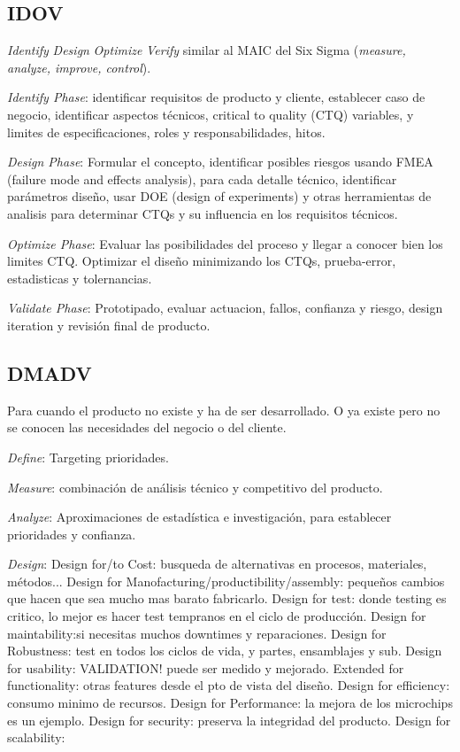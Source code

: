\documentclass[]{article}
\begin{document}
\subsection{IDOV} \textit{Identify} \textit{Design} \textit{Optimize} \textit{Verify} similar al MAIC del Six Sigma (\textit{measure, analyze, improve, control}).

\textit{Identify Phase}: identificar requisitos de producto y cliente, establecer caso de negocio, identificar aspectos técnicos, critical to quality (CTQ) variables, y limites de especificaciones, roles y responsabilidades, hitos.

\textit{Design Phase}: Formular el concepto, identificar posibles riesgos usando FMEA (failure mode and effects analysis), para cada detalle técnico, identificar parámetros diseño, usar DOE (design of experiments) y otras herramientas de analisis para determinar CTQs y su influencia en los requisitos técnicos.

\textit{Optimize Phase}: Evaluar las posibilidades del proceso y llegar a conocer bien los limites CTQ. Optimizar el diseño minimizando los CTQs, prueba-error, estadisticas y tolernancias.

\textit{Validate Phase}: Prototipado, evaluar actuacion, fallos, confianza y riesgo, design iteration y revisión final de producto.

\subsection{DMADV} Para cuando el producto no existe y ha de ser desarrollado. O ya existe pero no se conocen las necesidades del negocio o del cliente. 

\textit{Define}: Targeting prioridades.

\textit{Measure}: combinación de análisis técnico y competitivo del producto. 

\textit{Analyze}: Aproximaciones de estadística e investigación, para establecer prioridades y confianza.

\textit{Design}: Design for/to Cost: busqueda de alternativas en procesos, materiales, métodos... Design for Manofacturing/productibility/assembly: pequeños cambios que hacen que sea mucho mas barato fabricarlo. Design for test: donde testing es critico, lo mejor es hacer test tempranos en el ciclo de producción. Design for maintability:si necesitas muchos downtimes y reparaciones. Design for Robustness: test en todos los ciclos de vida, y partes, ensamblajes y sub. Design for usability: VALIDATION!  puede ser medido y mejorado. Extended for functionality: otras features desde el pto de vista del diseño. Design for efficiency: consumo minimo de recursos. Design for Performance: la mejora de los microchips es un ejemplo. Design for security: preserva la integridad del producto. Design for scalability: 
\end{document}
